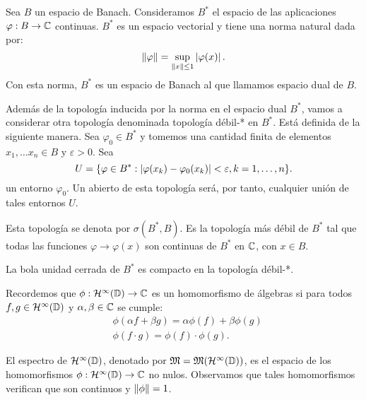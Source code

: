 \begin{definition}
    Sea $B$ un espacio de Banach. Consideramos $B^*$ el espacio de las aplicaciones $\varphi: B \rightarrow \mathbb{C}$ continuas. $B^*$ es un espacio vectorial y tiene una norma natural dada por:
    \begin{equation*}
        \left\lVert\varphi\right\rVert = \sup_{\left\lVert x\right\rVert \leq 1} \left\lvert\varphi(x)\right\rvert.
    \end{equation*}
    Con esta norma, $B^*$ es un espacio de Banach al que llamamos espacio dual de $B$.
\end{definition}

\medskip
Además de la topología inducida por la norma en el espacio dual $B^*$, vamos a considerar otra topología denominada topología débil-* en $B^*$. Está definida de la siguiente manera. Sea $\varphi_0 \in B^*$ y tomemos una cantidad finita de elementos $x_1, \dots x_n \in B$ y $\varepsilon > 0$. Sea
\begin{equation*}
U = \{ \varphi \in B^*: \left\lvert\varphi(x_k) - \varphi_0 (x_k)\right\rvert < \varepsilon, k = 1, \dots, n\}.
\end{equation*}
un entorno $\varphi_0$. Un abierto de esta topología será, por tanto, cualquier unión de tales entornos $U$.

Esta topología se denota por $\sigma(B^*, B)$. Es la topología más débil de $B^*$ tal que todas las funciones $\varphi \rightarrow \varphi(x)$ son continuas de $B^*$ en $\mathbb{C}$, con $x \in B$. %

\begin{obs}
    La bola unidad cerrada de $B^*$ es compacto en la topología débil-*.
\end{obs}
\bigskip

Recordemos que $\phi : \mathcal{H}^{\infty}(\mathbb{D}) \rightarrow \mathbb{C}$ es un homomorfismo de álgebras si para todos $f, g \in \mathcal{H}^{\infty}(\mathbb{D})$ y $\alpha, \beta \in \mathbb{C}$ se cumple:
\begin{equation}
    \begin{split}
        & \phi (\alpha f + \beta g) = \alpha \phi(f) + \beta \phi(g) \\
        & \phi(f \cdot g) = \phi(f) \cdot \phi(g).
    \end{split}
\end{equation}

El espectro de $\mathcal{H}^{\infty}(\mathbb{D})$, denotado por $\mathfrak{M} = \mathfrak{M} (\mathcal{H}^{\infty}(\mathbb{D}))$, es el espacio de los homomorfismos $\phi: \mathcal{H}^{\infty}(\mathbb{D}) \rightarrow \mathbb{C}$ no nulos. Observamos que tales homomorfismos verifican que son continuos y $\left\lVert\phi\right\rVert = 1$. \\

